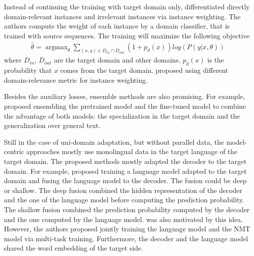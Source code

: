 Instead of continuing the training with target domain only, \citet{Chen17cost} differentiated directly domain-relevant instances and irrelevant instances via instance weighting. The authors compute the weight of each instance by a domain classifier, that is trained with source sequences. The training will maximize the following objective 
\begin{equation}
\begin{array}{rcl}
\hat{\theta} = \displaystyle{\mathop{\arg max}_{\theta} \mathop{\sum}_{(x,y)\in D_{in} \cap D_{out}}} (1+p_d(x))log(P(y|x,\theta))
\end{array}
\end{equation}
where $D_{in}$, $D_{out}$ are the target domain and other domains, $p_d(x)$ is the probability that $x$ comes from the target domain. \citet{Wang17instance} proposed using different domain-relevance metric for instance weighting. 

Besides the auxiliary losses, ensemble methods are also promising. For example, \citet{Freitag16fast} proposed ensembling the pretrained model and the fine-tuned model to combine the advantage of both models: the specialization in the target domain and the generalization over general text.

Still in the case of uni-domain adaptation, but without parallel data, the model-centric approaches mostly use monolingual data in the target language of the target domain. The proposed methods mostly adapted the decoder to the target domain. For example, \citet{Gulcehre16monolingual} proposed training a language model adapted to the target domain and fusing the language model to the decoder. The fusion could be deep or shallow. The deep fusion combined the hidden representation of the decoder and the one of the language model before computing the prediction probability. The shallow fusion combined the prediction probability computed by the decoder and the one computed by the language model. \citet{Domhan17using} was also motivated by this idea. However, the authors proposed jointly training the language model and the NMT model via multi-task training. Furthermore, the decoder and the language model shared the word embedding of the target side.

